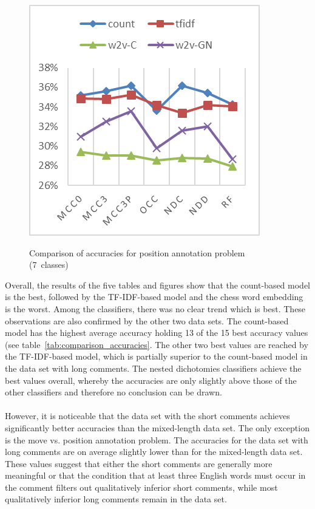 \documentclass[article,type=msc,colorback,accentcolor=tud7b]{tudthesis}
\begin{document}
\begin{figure}[H]
\begin{floatrow}
{	    \includegraphics{images/position_2}
      }{%
	    \caption{Comparison of accuracies for position annotation problem (7~classes)}
        \label{fig:position_2}
      }
      \end{floatrow}
    \end{figure}

Overall, the results of the five tables and figures show that the count-based model is the best, followed by the TF-IDF-based model and the chess word embedding is the worst. Among the classifiers, there was no clear trend which is best. These observations are also confirmed by the other two data sets. The count-based model has the highest average accuracy holding 13 of the 15 best accuracy values (see table~\ref{tab:comparison_accuracies}. The other two best values are reached by the TF-IDF-based model, which is partially superior to the count-based model in the data set with long comments. The nested dichotomies classifiers achieve the best values overall, whereby the accuracies are only slightly above those of the other classifiers and therefore no conclusion can be drawn. \\\\
However, it is noticeable that the data set with the short comments achieves significantly better accuracies than the mixed-length data set. The only exception is the move vs. position annotation problem. The accuracies for the data set with long comments are on average slightly lower than for the mixed-length data set. These values suggest that either the short comments are generally more meaningful or that the condition that at least three English words must occur in the comment filters out qualitatively inferior short comments, while most qualitatively inferior long comments remain in the data set.
\end{document}
